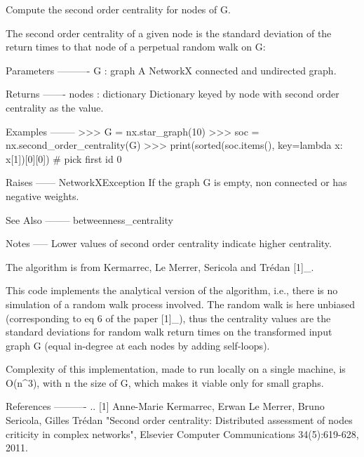 \begin{DoxyVerb}Compute the second order centrality for nodes of G.

The second order centrality of a given node is the standard deviation of
the return times to that node of a perpetual random walk on G:

Parameters
----------
G : graph
  A NetworkX connected and undirected graph.

Returns
-------
nodes : dictionary
   Dictionary keyed by node with second order centrality as the value.

Examples
--------
>>> G = nx.star_graph(10)
>>> soc = nx.second_order_centrality(G)
>>> print(sorted(soc.items(), key=lambda x: x[1])[0][0])  # pick first id
0

Raises
------
NetworkXException
    If the graph G is empty, non connected or has negative weights.

See Also
--------
betweenness_centrality

Notes
-----
Lower values of second order centrality indicate higher centrality.

The algorithm is from Kermarrec, Le Merrer, Sericola and Trédan [1]_.

This code implements the analytical version of the algorithm, i.e.,
there is no simulation of a random walk process involved. The random walk
is here unbiased (corresponding to eq 6 of the paper [1]_), thus the
centrality values are the standard deviations for random walk return times
on the transformed input graph G (equal in-degree at each nodes by adding
self-loops).

Complexity of this implementation, made to run locally on a single machine,
is O(n^3), with n the size of G, which makes it viable only for small
graphs.

References
----------
.. [1] Anne-Marie Kermarrec, Erwan Le Merrer, Bruno Sericola, Gilles Trédan
   "Second order centrality: Distributed assessment of nodes criticity in
   complex networks", Elsevier Computer Communications 34(5):619-628, 2011.
\end{DoxyVerb}
 
